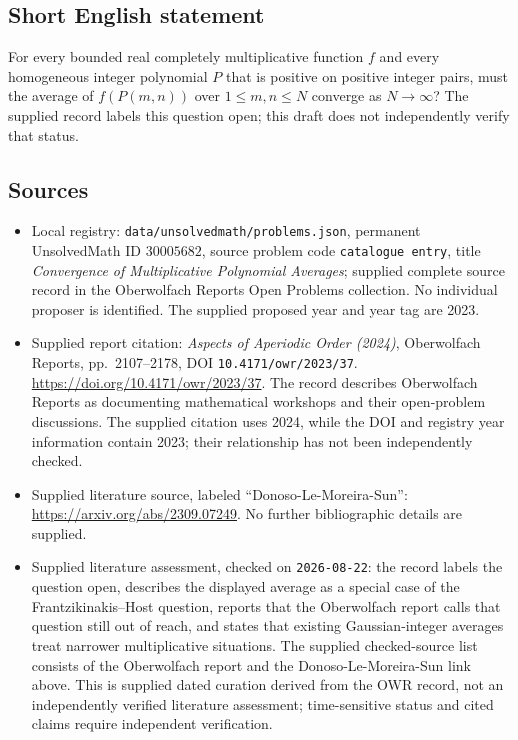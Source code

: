 \documentclass[11pt]{article}
\begin{document}
\subsection{Short English statement}
For every bounded real completely multiplicative function \(f\) and every homogeneous integer polynomial \(P\) that is positive on positive integer pairs, must the average of \(f(P(m,n))\) over \(1\le m,n\le N\) converge as \(N\to\infty\)? The supplied record labels this question open; this draft does not independently verify that status.
\subsection{Sources}
\begin{itemize}
\item Local registry: \texttt{data/unsolvedmath/problems.json}, permanent UnsolvedMath ID \(30005682\), source problem code \texttt{catalogue entry}, title \emph{Convergence of Multiplicative Polynomial Averages}; supplied complete source record in the Oberwolfach Reports Open Problems collection. No individual proposer is identified. The supplied proposed year and year tag are 2023.
\item Supplied report citation: \emph{Aspects of Aperiodic Order (2024)}, Oberwolfach Reports, pp.\ 2107--2178, DOI \texttt{10.4171/owr/2023/37}. \url{https://doi.org/10.4171/owr/2023/37}. The record describes Oberwolfach Reports as documenting mathematical workshops and their open-problem discussions. The supplied citation uses 2024, while the DOI and registry year information contain 2023; their relationship has not been independently checked.
\item Supplied literature source, labeled ``Donoso-Le-Moreira-Sun'': \url{https://arxiv.org/abs/2309.07249}. No further bibliographic details are supplied.
\item Supplied literature assessment, checked on \texttt{2026-08-22}: the record labels the question open, describes the displayed average as a special case of the Frantzikinakis--Host question, reports that the Oberwolfach report calls that question still out of reach, and states that existing Gaussian-integer averages treat narrower multiplicative situations. The supplied checked-source list consists of the Oberwolfach report and the Donoso-Le-Moreira-Sun link above. This is supplied dated curation derived from the OWR record, not an independently verified literature assessment; time-sensitive status and cited claims require independent verification.
\end{itemize}
\end{document}
